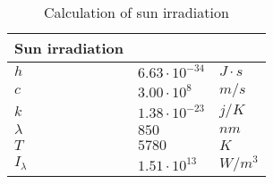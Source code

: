 \begin{table}[H]
\centering
\caption{Calculation of sun irradiation}
\label{tab:sun_irradiance}
\begin{tabular}{|l|ll|} \hline
\textbf{Sun irradiation} &          &                          \\ \hline
$h                        $&$ 6.63\cdot10^{-34} $&$ J\cdot s                 $\\
$c                        $&$ 3.00\cdot10^8     $&$ m/s                      $\\
$k                        $&$ 1.38\cdot10^{-23} $&$ j/K                      $\\
$\lambda                  $&$ 850               $&$ nm                         $\\
$T                        $&$ 5780              $&$ K                        $\\
$I_\lambda                $&$ 1.51\cdot10^{13}  $&$ W/m^3 $\\ \hline
\end{tabular}
\end{table}